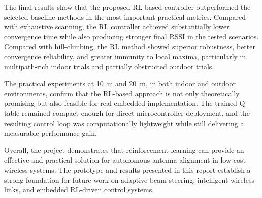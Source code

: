The final results show that the proposed RL-based controller outperformed the selected
baseline methods in the most important practical metrics. Compared with exhaustive
scanning, the RL controller achieved substantially lower convergence time while also
producing stronger final RSSI in the tested scenarios. Compared with hill-climbing, the
RL method showed superior robustness, better convergence reliability, and greater immunity
to local maxima, particularly in multipath-rich indoor trials and partially obstructed
outdoor trials.

The practical experiments at 10~m and 20~m, in both indoor and outdoor environments,
confirm that the RL-based approach is not only theoretically promising but also feasible
for real embedded implementation. The trained Q-table remained compact enough for direct
microcontroller deployment, and the resulting control loop was computationally lightweight
while still delivering a measurable performance gain.

Overall, the project demonstrates that reinforcement learning can provide an effective and
practical solution for autonomous antenna alignment in low-cost wireless systems. The
prototype and results presented in this report establish a strong foundation for future
work on adaptive beam steering, intelligent wireless links, and embedded RL-driven control
systems.
